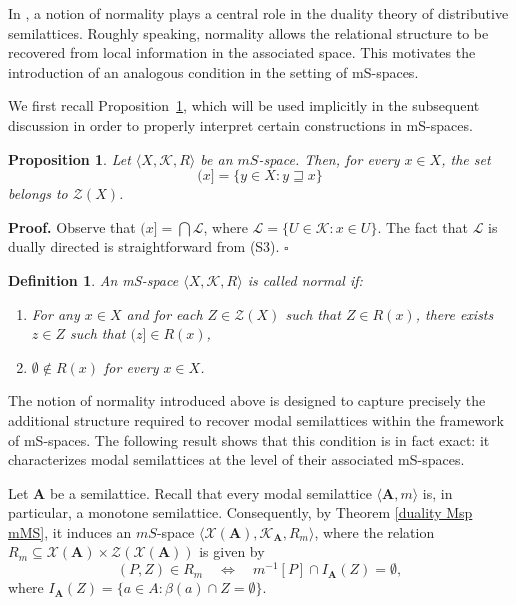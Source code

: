 \documentclass{article}
\newtheorem{definition}{\bf Definition}[section]
\newtheorem{proposition}{\bf Proposition}[section]
\newenvironment{proof}
{\par\noindent\textbf{Proof. }\rm}
{\hfill$\boldsymbol{\square}$\par\vspace{0.3cm}}
\begin{document}
\medskip

In \cite{CM}, a notion of normality plays a central role in the duality theory of distributive semilattices. Roughly speaking, normality allows the relational structure to be recovered from local information in the associated space. This motivates the introduction of an analogous condition in the setting of mS-spaces.

\medskip

We first recall Proposition~\ref{decreciente interseccion de abiertos}, which will be used implicitly in the subsequent discussion in order to properly interpret certain constructions in mS-spaces.

\begin{proposition}\label{decreciente interseccion de abiertos}        
Let $\langle X,\mathcal{K}, R \rangle$ be an $mS$-space. Then, for every $x \in X$, the set 
\[(x]=\{y\in X : y\sqsupseteq x\}\] 
belongs to $\mathcal{Z}(X)$.
\end{proposition}
\begin{proof}
Observe that $(x]=\bigcap \mathcal{L}$, where $\mathcal{L}=\{U\in \mathcal{K}\colon x\in U\}$. The fact that $\mathcal{L}$ is dually directed is straightforward from (S3).
\end{proof}


\begin{definition}\label{espacio normal}
    An mS-space $\langle X, \mathcal{K}, R \rangle$ is called \textit{normal} if:  
\begin{enumerate}
    \item[\normalfont {(N1)}] For any $x \in X$ and for each $Z \in \mathcal{Z}(X)$ such that $Z \in R(x)$, there exists $z \in Z$ such that $(z] \in R(x)$,  
    \item[\normalfont (N2)] $\emptyset \notin R(x)$ for every $x \in X$.
\end{enumerate}

\end{definition}


The notion of normality introduced above is designed to capture precisely the additional structure required to recover modal semilattices within the framework of mS-spaces. The following result shows that this condition is in fact exact: it characterizes modal semilattices at the level of their associated mS-spaces.
\medskip

Let $\mathbf{A}$ be a semilattice. Recall that every modal semilattice $\langle \mathbf{A}, m \rangle$ is, in particular, a monotone semilattice. Consequently, by Theorem \ref{duality Msp mMS}, it induces an $mS$-space $\langle \mathcal{X}(\mathbf{A}), \mathcal{K}_{\mathbf{A}}, R_m \rangle$, where the relation
$R_m \subseteq \mathcal{X}(\mathbf{A}) \times \mathcal{Z}(\mathcal{X}(\mathbf{A}))$
is given by
\begin{equation}\label{def: def R_m}
(P,Z)\in R_m \quad \Longleftrightarrow \quad m^{-1}[P]\cap I_{\mathbf{A}}(Z)=\emptyset,
\end{equation}
where $I_{\mathbf{A}}(Z)= \{a \in A : \beta(a) \cap Z = \emptyset\}$.
\end{document}
